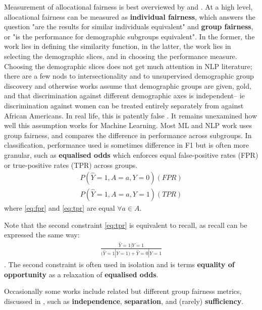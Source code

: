 Measurement of allocational fairness is best overviewed by \citet{hutchinson_mitchell_2019} and \citet{barocas-hardt-narayanan}. At a high level, allocational fairness can be measured as \textbf{individual fairness}, which answers the question "are the results for similar individuals equivalent" and \textbf{group fairness}, or "is the performance for demographic subgroups equivalent". In the former, the work lies in defining the similarity function, in the latter, the work lies in selecting the demographic slices, and in choosing the performance measure. Choosing the demographic slices does not get much attention in NLP literature; there are a few nods to intersectionality \citep{} and to unsupervised demographic group discovery \citep{zhao-chang-2020-logan} and otherwise works assume that demographic groups are given, gold, and that discrimination against different demographic axes is independent-- ie discrimination against women can be treated entirely separately from against African Americans. In real life, this is patently false \citep{some intersectionality thing}. It remains unexamined how well this assumption works for Machine Learning. Most ML and NLP work uses group fairness, and compares the difference in performance across subgroups.  In classification, performance used is sometimes difference in F1 \citep{zhao-etal-2018-gender} but is often more granular, such as \textbf{equalised odds} \citep{hardt2016equality} which enforces equal false-positive rates (FPR) or true-positive rates (TPR) across groups.
\begin{align}\label{eq:fpr}
    P(\hat{Y} = 1, A=a, Y=0) (FPR)
\end{align}
\begin{align}\label{eq:tpr}
    P(\hat{Y} = 1, A=a, Y=1) (TPR)
\end{align}
where \ref{eq:fpr} and \ref{eq:tpr} are equal $\forall a \in A$.

Note that the second constraint \ref{eq:tpr} is equivalent to recall, as recall can be expressed the same way:
\begin{align}\label{eq:recall}
    \frac{\hat{Y} = 1 | Y=1}{(\hat{Y} = 1 | Y=1) + \hat{Y} = 0 | Y=1}
\end{align}.
The second constraint is often used in isolation and is terms \textbf{equality of opportunity} \citep{hardt2016equality} as a relaxation of \textbf{equalised odds}. 

Occasionally some works include related but different group fairness metrics, discussed in \citet{barocas-hardt-narayanan}, such as \textbf{independence}, \textbf{separation}, and (rarely) \textbf{sufficiency}. 

